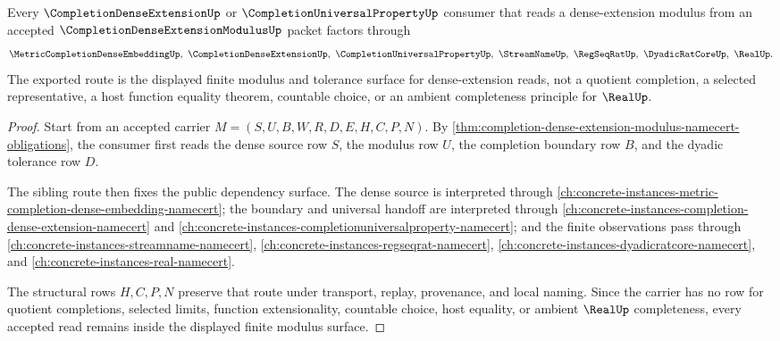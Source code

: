 \begin{theorem}
\label{thm:completion-dense-extension-modulus-route}
Every $\CompletionDenseExtensionUp$ or $\CompletionUniversalPropertyUp$ consumer that reads a dense-extension modulus from an accepted $\CompletionDenseExtensionModulusUp$ packet factors through
$$
\MetricCompletionDenseEmbeddingUp,\ \CompletionDenseExtensionUp,\ \CompletionUniversalPropertyUp,\ \StreamNameUp,\ \RegSeqRatUp,\ \DyadicRatCoreUp,\ \RealUp .
$$
The exported route is the displayed finite modulus and tolerance surface for dense-extension reads, not a quotient completion, a selected representative, a host function equality theorem, countable choice, or an ambient completeness principle for $\RealUp$.
\end{theorem}
\begin{proof}
Start from an accepted carrier $M=(S,U,B,W,R,D,E,H,C,P,N)$. By \autoref{thm:completion-dense-extension-modulus-namecert-obligations}, the consumer first reads the dense source row $S$, the modulus row $U$, the completion boundary row $B$, and the dyadic tolerance row $D$.

The sibling route then fixes the public dependency surface. The dense source is interpreted through \autoref{ch:concrete-instances-metric-completion-dense-embedding-namecert}; the boundary and universal handoff are interpreted through \autoref{ch:concrete-instances-completion-dense-extension-namecert} and \autoref{ch:concrete-instances-completionuniversalproperty-namecert}; and the finite observations pass through \autoref{ch:concrete-instances-streamname-namecert}, \autoref{ch:concrete-instances-regseqrat-namecert}, \autoref{ch:concrete-instances-dyadicratcore-namecert}, and \autoref{ch:concrete-instances-real-namecert}.

The structural rows $H,C,P,N$ preserve that route under transport, replay, provenance, and local naming. Since the carrier has no row for quotient completions, selected limits, function extensionality, countable choice, host equality, or ambient $\RealUp$ completeness, every accepted read remains inside the displayed finite modulus surface.
\end{proof}



